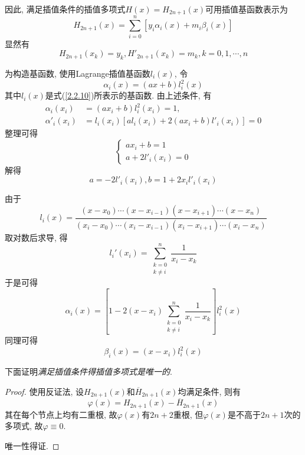 因此, 满足插值条件的插值多项式$H(x)=H_{2n+1}(x)$可用插值基函数表示为
\begin{equation*}
    H_{2n+1}(x)=\sum_{i=0}^n\left[y_i\alpha_i(x)+m_i\beta_i(x)\right]
\end{equation*}
显然有
\begin{equation*}
    H_{2n+1}(x_k)=y_k, H'_{2n+1}(x_k)=m_k, k=0,1,\cdots,n
\end{equation*}

为构造基函数, 使用Lagrange插值基函数$l_i(x)$, 令
\begin{equation*}
    \alpha_i(x)=(ax+b)l_i^2(x)
\end{equation*}
其中$l_i(x)$是式(\ref{2.2.10})所表示的基函数. 由上述条件, 有
\begin{align*}
    \alpha_i(x_i)&=(ax_i+b)l_i^2(x_i)=1,\\
    \alpha'_i(x_i)&=l_i(x_i)\left[al_i(x_i)+2(ax_i+b)l'_i(x_i)\right]=0
\end{align*}
整理可得
\begin{equation*}
    \begin{cases}
        ax_i+b=1\\
        a+2l'_i(x_i)=0
    \end{cases}
\end{equation*}
解得
\begin{equation*}
    a=-2l'_i(x_i), b=1+2x_il'_i(x_i)
\end{equation*}

由于
\begin{equation*}
    l_i(x)=\frac{(x-x_0)\cdots(x-x_{i-1})(x-x_{i+1})\cdots(x-x_n)}{(x_i-x_0)\cdots(x_i-x_{i-1})(x_i-x_{i+1})\cdots(x_i-x_n)}
\end{equation*}
取对数后求导, 得
\begin{equation*}
    l_i'(x_i)=\sum_{\substack{k=0\\k\ne i}}^n\frac{1}{x_i-x_k}
\end{equation*}
于是可得
\begin{equation}\label{eqn:2.6.4}
    \alpha_i(x)=\left[1-2(x-x_i)\sum_{\substack{k=0\\k\ne i}}^n\frac{1}{x_i-x_k}\right]l_i^2(x)
\end{equation}
同理可得
\begin{equation}\label{eqn:2.6.5}
    \beta_i(x)=(x-x_i)l_i^2(x)
\end{equation}

\begin{extend}
    下面证明\emph{满足插值条件得插值多项式是唯一的}.

    \begin{proof}
        使用反证法, 设$H_{2n+1}(x)$和$\overline{H}_{2n+1}(x)$均满足条件, 则有
        \begin{equation*}
            \varphi(x)=H_{2n+1}(x)-\overline{H}_{2n+1}(x)
        \end{equation*}
        其在每个节点上均有二重根, 故$\varphi(x)$有$2n+2$重根, 但$\varphi(x)$是不高于$2n+1$次的多项式, 故$\varphi\equiv0$.

        唯一性得证.
    \end{proof}
\end{extend}

